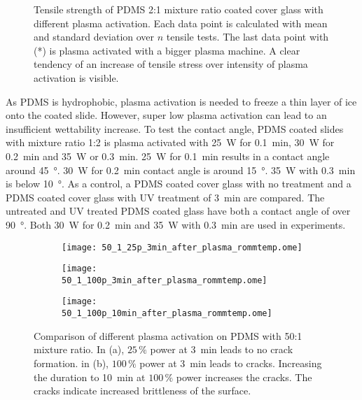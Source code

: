 \begin{figure}[hbt!]
	\centering
	
	\caption{Tensile strength of PDMS 2:1 mixture ratio coated cover glass with different plasma activation. Each data point is calculated with mean and standard deviation over $n$ tensile tests. The last data point with (*) is plasma activated with a bigger plasma machine. A clear tendency of an increase of tensile stress over intensity of plasma activation is visible.}
	\label{fig:PlotPlasmaAktivierung}
\end{figure}

As PDMS is hydrophobic, plasma activation is needed to freeze a thin layer of ice onto the coated slide. However, super low plasma activation can lead to an insufficient wettability increase. To test the contact angle,  PDMS coated slides with mixture ratio 1:2 is plasma activated with \SI{25}{\watt} for \SI{0.1}{\minute}, \SI{30}{\watt} for \SI{0.2}{\minute} and \SI{35}{\watt} or \SI{0.3}{\minute}. \SI{25}{\watt} for \SI{0.1}{\minute} results in a contact angle around \SI{45}{\degree}. \SI{30}{\watt} for \SI{0.2}{\minute} contact angle is around \SI{15}{\degree}. \SI{35}{\watt} with \SI{0.3}{\minute} is below \SI{10}{\degree}. As a control, a PDMS coated cover glass with no treatment and a PDMS coated cover glass with UV treatment of \SI{3}{\minute} are compared. The untreated and UV treated PDMS coated glass have both a contact angle of over \SI{90}{\degree}. Both \SI{30}{\watt} for \SI{0.2}{\minute} and \SI{35}{\watt} with \SI{0.3}{\minute} are used in experiments.

\begin{figure}[hbt!]
	\centering
	\begin{subfigure}[]{0.45\textwidth}
		\centering
		\texttt{[image: 50\_1\_25p\_3min\_after\_plasma\_rommtemp.ome]}
		\caption{}
	\end{subfigure}
	\begin{subfigure}[]{0.45\textwidth}
		\centering
		\texttt{[image: 50\_1\_100p\_3min\_after\_plasma\_rommtemp.ome]}
		\caption{}
	\end{subfigure}
	\begin{subfigure}[]{0.45\textwidth}
		\centering
		\texttt{[image: 50\_1\_100p\_10min\_after\_plasma\_rommtemp.ome]}
		\caption{}
	\end{subfigure}
	\caption{Comparison of different plasma activation on PDMS with 50:1 mixture ratio. In (a), $25\,\%$ power at \SI{3}{\minute} leads to no crack formation. in (b), $100\,\%$ power at \SI{3}{\minute} leads to cracks. Increasing the duration to \SI{10}{\minute} at $100\,\%$ power increases the cracks. The cracks indicate increased brittleness of the surface.}
	\label{fig:Vgl50:1Plasma}
\end{figure}

